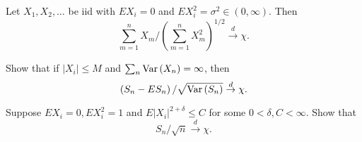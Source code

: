 \begin{exercise}
	Let \(X_{1},X_{2},\ldots\) be iid with \(EX_{i}=0\) and \(EX_{i}^{2}=\sigma^{2}\in(0,\infty)\). Then
	\begin{equation*}
		\sum_{m=1}^{n}X_{m}/\left(\sum_{m=1}^{n}X_{m}^{2}\right)^{1/2}\stackrel{d}{\rightarrow}\chi.
	\end{equation*}
\end{exercise}

\begin{exercise}
	Show that if \(\left|X_{i}\right|\leq M\) and \(\sum_{n}\mathrm{Var}\left(X_{n}\right)=\infty\), then
	\begin{equation*}
		\left(S_{n}-E S_{n}\right)/\sqrt{\mathrm{Var}\left(S_{n}\right)}\stackrel{d}{\rightarrow}\chi.
	\end{equation*}
\end{exercise}

\begin{exercise}
	Suppose \(EX_{i}=0,EX_{i}^{2}=1\) and \(E\left|X_{i}\right|^{2+\delta}\leq C\) for some \(0<\delta,C<\infty\). Show that
	\begin{equation*}
		S_{n}/\sqrt{n}\stackrel{d}{\rightarrow}\chi.
	\end{equation*}
\end{exercise}
